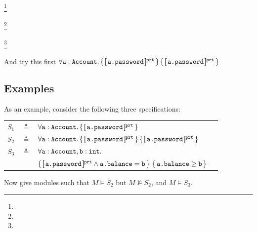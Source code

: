   \footnote{}%
  
 
  
  \footnote{}
 
\footnote{}
%
%
%



And try this first $\TwoStatesQ {\prg{a}:\prg{Account}}  {\inside{\prg{a.password}}} {\inside{\prg{a.password}}}$

\subsection{Examples}
\noindent
As an example, consider the following three  specifications:

\begin{tabular}{lcll}
$S_1$   &     $\triangleq$   & $\forall {{\texttt{a}}:{\texttt{Account}} }.\, {\{}\, [\!\![ \,{\texttt{a.password}}\, ]\!\!]^{{\texttt{prt}}} \,{\}}  $
 \\
 $S_2$   & $\triangleq$   &  $\TwoStatesQ {\prg{a}:\prg{Account}}  {\inside{\prg{a.password}}} {\inside{\prg{a.password}}}$
 \\
$S_3$ & $\triangleq$   &
  $\forall {\texttt{a}}:{\texttt{Account}},{\texttt{b}}:{\texttt{int}}.$\\
  &  &  ${\{}\, [\!\![ \,{\texttt{a.password}}\, ]\!\!]^{{\texttt{prt}}} \wedge {\texttt{a.balance}}={\texttt{b}} \,{\}}  
\  {\{}\,  {\texttt{a.balance}}\geq {\texttt{b}}  \,{\}}$
\end{tabular}

Now give modules such that $M \models S_2$ but $M \not\models S_2$, and $M \models S_3$.


